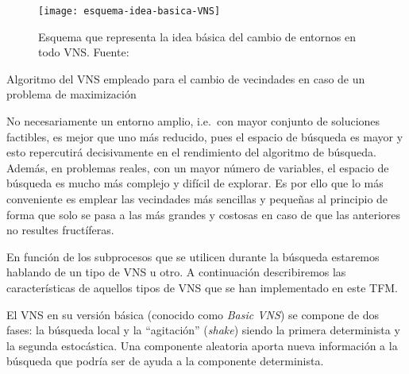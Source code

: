 \begin{figure}
    \centering
    \texttt{[image: esquema-idea-basica-VNS]}
    \caption[Esquema que representa la idea básica del cambio de entornos en todo VNS]{Esquema que representa la idea básica del cambio de entornos en todo VNS. Fuente:~\cite{sota:metaheuristicas-design-impl}}
    \label{fig:esquema-idea-basica-VNS}
\end{figure}

\begin{algorithm}[htbp]
    \caption{Algoritmo del VNS empleado para el cambio de vecindades en caso de un problema de maximización}
    \label{algoritmo:VNS-cambio-entornos}

    \DontPrintSemicolon
    \medskip

\end{algorithm}

No necesariamente un entorno amplio, i.e.\ con mayor conjunto de soluciones factibles, es mejor que uno más reducido, pues el espacio de búsqueda es mayor y esto repercutirá decisivamente en el rendimiento del algoritmo de búsqueda. Además, en problemas reales, con un mayor número de variables, el espacio de búsqueda es mucho más complejo y difícil de explorar. Es por ello que lo más conveniente es emplear las vecindades más sencillas y pequeñas al principio de forma que solo se pasa a las más grandes y costosas en caso de que las anteriores no resultes fructíferas.

En función de los subprocesos que se utilicen durante la búsqueda estaremos hablando de un tipo de VNS u otro. A continuación describiremos las características de aquellos tipos de VNS que se han implementado en este TFM\@.

El VNS en su versión básica (conocido como \textit{Basic VNS}) se compone de dos fases: la búsqueda local y la ``agitación'' (\textit{shake}) siendo la primera determinista y la segunda estocástica. Una componente aleatoria aporta nueva información a la búsqueda que podría ser de ayuda a la componente determinista.

